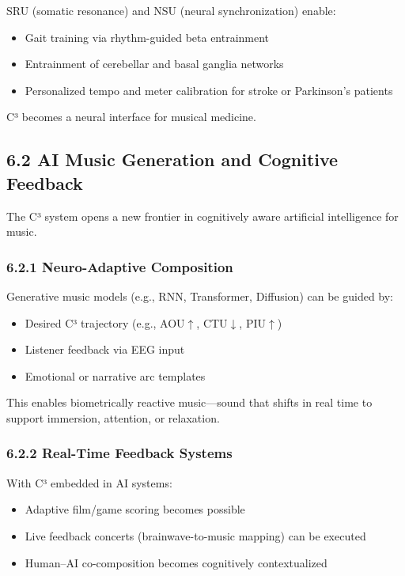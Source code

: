 SRU (somatic resonance) and NSU (neural synchronization) enable:

\begin{itemize}
    \item Gait training via rhythm-guided beta entrainment
    \item Entrainment of cerebellar and basal ganglia networks
    \item Personalized tempo and meter calibration for stroke or Parkinson’s patients
\end{itemize}

C³ becomes a neural interface for musical medicine.

\subsection*{6.2 AI Music Generation and Cognitive Feedback}

The C³ system opens a new frontier in cognitively aware artificial intelligence for music.

\subsubsection*{6.2.1 Neuro-Adaptive Composition}

Generative music models (e.g., RNN, Transformer, Diffusion) can be guided by:

\begin{itemize}
    \item Desired C³ trajectory (e.g., AOU$\uparrow$, CTU$\downarrow$, PIU$\uparrow$)
    \item Listener feedback via EEG input
    \item Emotional or narrative arc templates
\end{itemize}

This enables biometrically reactive music—sound that shifts in real time to support immersion, attention, or relaxation.

\subsubsection*{6.2.2 Real-Time Feedback Systems}

With C³ embedded in AI systems:

\begin{itemize}
    \item Adaptive film/game scoring becomes possible
    \item Live feedback concerts (brainwave-to-music mapping) can be executed
    \item Human–AI co-composition becomes cognitively contextualized
\end{itemize}

